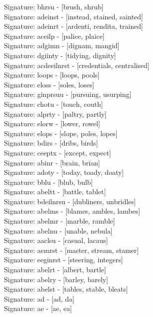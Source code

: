 Signature: {bhrsu} - [brush, shrub] \\
Signature: {adeinst} - [instead, stained, sainted] \\
Signature: {adeinrt} - [ardenti, rendita, trained] \\
Signature: {aceilp} - [palice, plaice] \\
Signature: {adgimn} - [dignam, mangid] \\
Signature: {dgiinty} - [tidying, dignity] \\
Signature: {acdeeilnrst} - [credentials, centralised] \\
Signature: {loops} - [loops, pools] \\
Signature: {eloss} - [soles, loses] \\
Signature: {ginprsuu} - [pursuing, usurping] \\
Signature: {chotu} - [touch, couth] \\
Signature: {alprty} - [paltry, partly] \\
Signature: {elorw} - [lower, rowel] \\
Signature: {elops} - [slope, poles, lopes] \\
Signature: {bdirs} - [dribs, birds] \\
Signature: {ceeptx} - [except, expect] \\
Signature: {abinr} - [brain, brian] \\
Signature: {adoty} - [today, toady, doaty] \\
Signature: {bblu} - [blub, bulb] \\
Signature: {abeltt} - [battle, tablet] \\
Signature: {bdeilnrsu} - [dubliners, unbridles] \\
Signature: {abelms} - [blames, ambles, lambes] \\
Signature: {abelmr} - [marble, ramble] \\
Signature: {abelnu} - [unable, nebula] \\
Signature: {aaclsu} - [casual, lacaus] \\
Signature: {aemrst} - [master, stream, stamer] \\
Signature: {eeginrst} - [steering, integers] \\
Signature: {abelrt} - [albert, bartle] \\
Signature: {abelry} - [barley, barely] \\
Signature: {abelst} - [tables, stable, bleats] \\
Signature: {ad} - [ad, da] \\
Signature: {ae} - [ae, ea] \\
